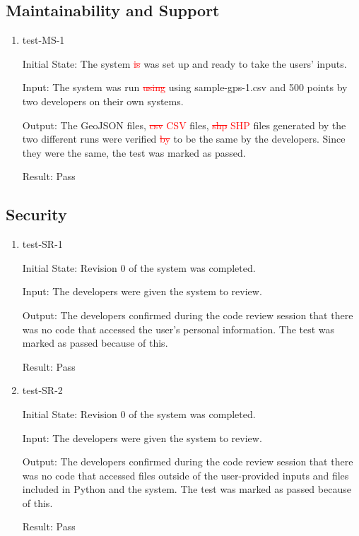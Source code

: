\documentclass[12pt, titlepage]{article}
\begin{document}
\subsection{Maintainability and Support}

\begin{enumerate}

\item{test-MS-1} \label{test-MS-1}

Initial State: The system \textcolor{red}{\sout{is}} was set up and ready to take the users' inputs.

Input: The system was run \textcolor{red}{\sout{using}} using sample-gps-1.csv and 500 points by two developers on their own systems.

Output: The GeoJSON files, \textcolor{red}{\sout{csv} CSV} files, \textcolor{red}{\sout{shp} SHP} files generated by the two different runs were verified \textcolor{red}{\sout{by}} to be the same by the developers. Since they were the same, the test was marked as passed.

Result: Pass

\end{enumerate}

\subsection{Security}

\begin{enumerate}
    \item{test-SR-1} \label{test-SR-1}
    
    Initial State: Revision 0 of the system was completed.

    Input: The developers were given the system to review.
    
    Output: The developers confirmed during the code review session that there was no code that accessed the user's personal information. The test was marked as passed because of this.
    
    Result: Pass

    \item{test-SR-2} \label{test-SR-2}
    
    Initial State: Revision 0 of the system was completed.

    Input: The developers were given the system to review.
    
    Output: The developers confirmed during the code review session that there was no code that accessed files outside of the user-provided inputs and files included in Python and the system. The test was marked as passed because of this.
    
    Result: Pass
\end{enumerate}
\end{document}
